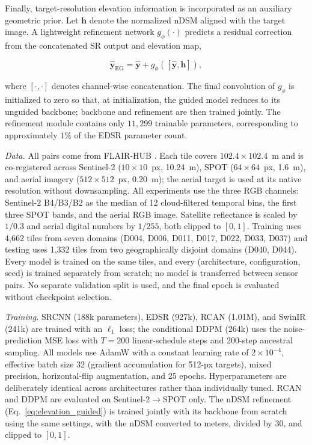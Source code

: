 \documentclass[conference]{IEEEtran}
\begin{document}
Finally, target-resolution elevation information is incorporated as an
auxiliary geometric prior. Let $\mathbf{h}$ denote the normalized nDSM
aligned with the target image. A lightweight refinement network
$g_{\phi}(\cdot)$ predicts a residual correction from the concatenated
SR output and elevation map,

\begin{equation}
\hat{\mathbf{y}}_{\mathrm{EG}}
=
\hat{\mathbf{y}}
+
g_{\phi}
\left(
[\hat{\mathbf{y}},\mathbf{h}]
\right),
\label{eq:elevation_guided}
\end{equation}

where $[\cdot,\cdot]$ denotes channel-wise concatenation. The final
convolution of $g_{\phi}$ is initialized to zero so that, at
initialization, the guided model reduces to its unguided backbone;
backbone and refinement are then trained jointly. The refinement
module contains only $11{,}299$ trainable parameters, corresponding to
approximately $1\%$ of the EDSR parameter count.

\emph{Data.} All pairs come from FLAIR-HUB \cite{garioud2026flairhub}.
Each tile covers $102.4\times102.4$~m and is co-registered across
Sentinel-2 ($10\times10$~px, 10.24~m), SPOT ($64\times64$~px,
1.6~m), and aerial imagery ($512\times512$~px, 0.20~m); the aerial
target is used at its native resolution without downsampling. All
experiments use the three RGB channels: Sentinel-2 B4/B3/B2 as the
median of 12 cloud-filtered temporal bins, the first three SPOT bands,
and the aerial RGB image. Satellite reflectance is scaled by
$1/0.3$ and aerial digital numbers by $1/255$, both clipped to
$[0,1]$. Training uses 4{,}662 tiles from seven domains (D004, D006,
D011, D017, D022, D033, D037) and testing uses 1{,}332 tiles from two
geographically disjoint domains (D040, D044). Every model is trained on
the same tiles, and every (architecture, configuration, seed) is
trained separately from scratch; no model is transferred between
sensor pairs. No separate validation split is used, and the final
epoch is evaluated without checkpoint selection.

\emph{Training.} SRCNN \cite{dong2016srcnn} (188k parameters), EDSR
\cite{lim2017edsr} (927k), RCAN \cite{zhang2018rcan} (1.01M), and
SwinIR \cite{liang2021swinir} (241k) are trained with an $\ell_1$
loss; the conditional DDPM (264k) uses the noise-prediction MSE loss
with $T{=}200$ linear-schedule steps and 200-step ancestral sampling.
All models use AdamW with a constant learning rate of
$2\times10^{-4}$, effective batch size 32 (gradient accumulation for
512-px targets), mixed precision, horizontal-flip augmentation, and
25 epochs. Hyperparameters are deliberately identical across
architectures rather than individually tuned. RCAN and DDPM are
evaluated on Sentinel-2$\rightarrow$SPOT only. The nDSM refinement
(Eq.~\ref{eq:elevation_guided}) is trained jointly with its backbone
from scratch using the same settings, with the nDSM converted to
meters, divided by 30, and clipped to $[0,1]$.
\end{document}
